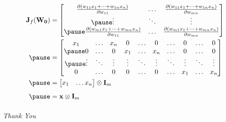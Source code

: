 \documentclass[12pt,aspectratio=169]{beamer}
\newcommand{\tens}[1]{%
  \mathbin{\mathop{\otimes}\limits_{#1}}%
}
\begin{document}
\begin{frame}

\[
\begin{aligned}
\mathbf{J}_f(\mathbf{W_0})&=
\begin{bmatrix}
\frac{\partial (w_{11}x_1+\dots + w_{1n}x_n)}{\partial w_{11}} & \dots & \frac{\partial (w_{11}x_1+\dots + w_{1n}x_n)}{\partial w_{mn}}\\ \pause
\vdots & \ddots & \vdots\\ \pause
\frac{\partial (w_{m1}x_1+\dots+w_{mn}x_n)}{\partial w_{11}} & \dots & \frac{\partial (w_{m1}x_1+\dots+w_{mn}x_n)}{\partial w_{mn}}
\end{bmatrix}\\ \pause
&=\begin{bmatrix}
x_1 & \dots & x_n & 0 & \dots & 0 & \dots & 0 & \dots & 0\\ \pause
0 & \dots & 0 & x_1 & \dots & x_n & \dots & 0 & \dots & 0  \\ \pause
\vdots & \ddots & \vdots & \vdots & \ddots & \vdots & \ddots & \vdots & \ddots & \vdots \\
0 & \dots & 0 & 0 & \dots & 0 & \dots & x_1 & \dots & x_n 
\end{bmatrix}\\ \pause
&=\begin{bmatrix}
x_1 & \dots x_n
\end{bmatrix}
\tens{} \mathbf{I}_m\\ \pause
&=\mathbf{x}\tens{} \mathbf{I}_m
\end{aligned}
\]
\end{frame}




\begin{frame}{}
  \centering \Huge
  \emph{Thank You}
\end{frame}
\end{document}

